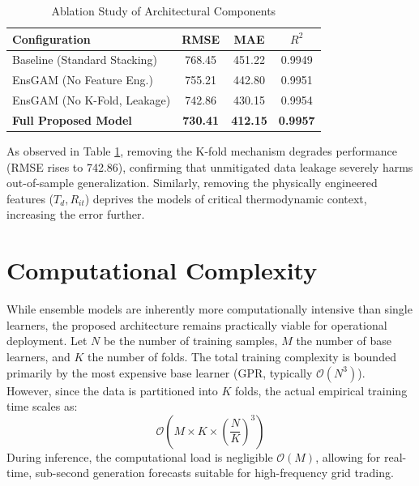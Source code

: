 \documentclass[conference]{IEEEtran}
\begin{document}
\begin{table}[htbp]
\caption{Ablation Study of Architectural Components}
\label{tab:ablation}
\begin{center}
\renewcommand{\arraystretch}{1.2}
\begin{tabular}{lccc}
\toprule
\textbf{Configuration} & \textbf{RMSE} & \textbf{MAE} & \textbf{$R^2$}\\
\midrule
Baseline (Standard Stacking) & 768.45 & 451.22 & 0.9949\\
EnsGAM (No Feature Eng.) & 755.21 & 442.80 & 0.9951\\
EnsGAM (No K-Fold, Leakage) & 742.86 & 430.15 & 0.9954\\
\textbf{Full Proposed Model} & \textbf{730.41} & \textbf{412.15} & \textbf{0.9957}\\
\bottomrule
\end{tabular}
\end{center}
\end{table}

As observed in Table \ref{tab:ablation}, removing the K-fold mechanism degrades performance (RMSE rises to 742.86), confirming that unmitigated data leakage severely harms out-of-sample generalization. Similarly, removing the physically engineered features ($T_d, R_{it}$) deprives the models of critical thermodynamic context, increasing the error further.


\section{Computational Complexity}

While ensemble models are inherently more computationally intensive than single learners, the proposed architecture remains practically viable for operational deployment. Let $N$ be the number of training samples, $M$ the number of base learners, and $K$ the number of folds. The total training complexity is bounded primarily by the most expensive base learner (GPR, typically $\mathcal{O}(N^3)$). 
However, since the data is partitioned into $K$ folds, the actual empirical training time scales as:
\begin{equation}
\mathcal{O}\left( M \times K \times \left( \frac{N}{K} \right)^3 \right)
\end{equation}
During inference, the computational load is negligible $\mathcal{O}(M)$, allowing for real-time, sub-second generation forecasts suitable for high-frequency grid trading.
\end{document}
